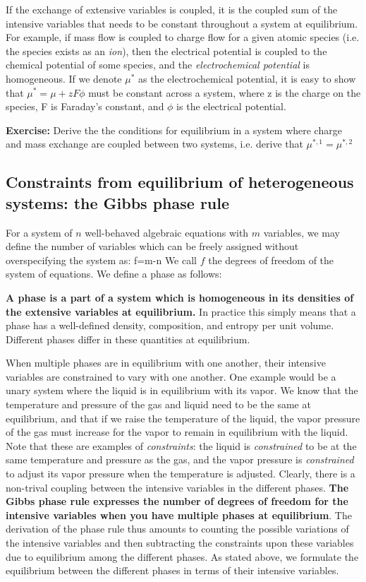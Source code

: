 \documentclass[12pt]{article}
\begin{document}
If the exchange of extensive variables is coupled, it is the coupled sum of the intensive variables that needs to be constant throughout a system at equilibrium. For example, if mass flow is coupled to charge flow for a given atomic species (i.e. the species exists as an \emph{ion}), then the electrical potential is coupled to the chemical potential of some species, and the \emph{electrochemical potential} is homogeneous. If we denote $\mu^*$ as the electrochemical potential, it is easy to show that
$\mu^*=\mu+z F\phi$ must be constant across a system, where z is the charge on the species, F is Faraday's constant, and $\phi$ is the electrical potential.

\textbf{Exercise:} Derive the the conditions for equilibrium in a system where charge and mass exchange are coupled between two systems, i.e. derive that $\mu^{*,1}=\mu^{*,2}$

\subsection{Constraints from equilibrium of heterogeneous systems: the Gibbs phase rule} \label{phaseRule}
For a system of $n$ well-behaved algebraic equations with $m$ variables, we may define the number of variables which can be freely assigned without overspecifying the system as:
\eqs f=m-n \eqe
We call $f$ the degrees of freedom of the system of equations. We define a phase as follows:

\textbf{A phase is a part of a system which is homogeneous in its densities of the extensive variables at equilibrium.} In practice this simply means that a phase has a well-defined density, composition, and entropy per unit volume. Different phases differ in these quantities at equilibrium. 

When multiple phases are in equilibrium with one another, their intensive variables are constrained to vary with one another. One example would be a unary system where the liquid is in equilibrium with its vapor. We know that the temperature and pressure of the gas and liquid need to be the same at equilibrium, and that if we raise the temperature of the liquid, the vapor pressure of the gas must increase for the vapor to remain in equilibrium with the liquid. Note that these are examples of \emph{constraints}: the liquid is \emph{constrained} to be at the same temperature and pressure as the gas, and the vapor pressure is \emph{constrained} to adjust its vapor pressure when the temperature is adjusted. Clearly, there is a non-trival coupling between the intensive variables in the different phases. \textbf{The Gibbs phase rule expresses the number of degrees of freedom for the intensive variables when you have multiple phases at equilibrium}. The derivation of the phase rule thus amounts to counting the possible variations of the intensive variables and then subtracting the constraints upon these variables due to equilibrium among the different phases.
As stated above, we formulate the equilibrium between the different phases in terms of their intensive variables. 
\end{document}
